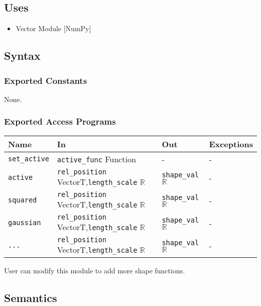 \documentclass[12pt, titlepage]{article}
\begin{document}
\subsection{Uses}
\begin{itemize}
\item Vector Module [NumPy]
\end{itemize}

\subsection{Syntax}

\subsubsection{Exported Constants}
None.

\subsubsection{Exported Access Programs}
\begin{center}
\begin{tabular}{p{2cm} p{5.6cm} p{3cm} p{2cm}}
\hline
\textbf{Name} & \textbf{In} & \textbf{Out} & \textbf{Exceptions} \\
\hline
\texttt{set\_active} & \texttt{active\_func} Function & - & - \\
\texttt{active}& \texttt{rel\_position} VectorT,\newline\texttt{length\_scale} $\mathbb{R}$ & \texttt{shape\_val} $\mathbb{R}$ & - \\
\texttt{squared}& \texttt{rel\_position} VectorT,\newline\texttt{length\_scale} $\mathbb{R}$ & \texttt{shape\_val} $\mathbb{R}$ & - \\
\texttt{gaussian}& \texttt{rel\_position} VectorT,\newline\texttt{length\_scale} $\mathbb{R}$ & \texttt{shape\_val} $\mathbb{R}$ & - \\
\texttt{...}& \texttt{rel\_position} VectorT,\newline\texttt{length\_scale} $\mathbb{R}$ & \texttt{shape\_val} $\mathbb{R}$ & - \\
\hline
\end{tabular}
\end{center}
User can modify this module to add more shape functions.

\subsection{Semantics}
\end{document}
